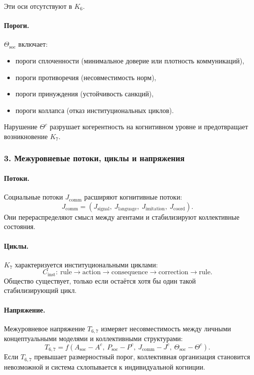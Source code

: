 Эти оси отсутствуют в $K_6$.

\paragraph{Пороги.}
$\Theta_{\mathrm{soc}}$ включает:
\begin{itemize}
  \item пороги сплоченности (минимальное доверие или плотность коммуникаций),
  \item пороги противоречия (несовместимость норм),
  \item пороги принуждения (устойчивость санкций),
  \item пороги коллапса (отказ институциональных циклов).
\end{itemize}

Нарушение $\Theta^{c}$ разрушает когерентность на когнитивном уровне и
предотвращает возникновение $K_7$.

\subsubsection{3. Межуровневые потоки, циклы и напряжения}

\paragraph{Потоки.}
Социальные потоки $J_{\mathrm{comm}}$ расширяют когнитивные потоки:
\[
J_{\mathrm{comm}} = (J_{\mathrm{signal}},\ J_{\mathrm{language}},\
                     J_{\mathrm{imitation}},\ J_{\mathrm{coord}}).
\]
Они перераспределяют смысл между агентами и стабилизируют коллективные состояния.

\paragraph{Циклы.}
$K_7$ характеризуется институциональными циклами:
\[
C_{\mathrm{inst}}:\ \text{rule} \rightarrow \text{action}
\rightarrow \text{consequence} \rightarrow \text{correction}
\rightarrow \text{rule}.
\]
Общество существует, только если остаётся хотя бы один такой стабилизирующий цикл.

\paragraph{Напряжение.}
Межуровневое напряжение $T_{6,7}$ измеряет несовместимость между личными
концептуальными моделями и коллективными структурами:
\[
T_{6,7} = f(A_{\mathrm{soc}} - A^{c},\ P_{\mathrm{soc}} - P^{c},\
          J_{\mathrm{comm}} - J^{c},\ \Theta_{\mathrm{soc}} - \Theta^{c}).
\]
Если $T_{6,7}$ превышает размерностный порог, коллективная организация
становится невозможной и система схлопывается к индивидуальной когниции.

